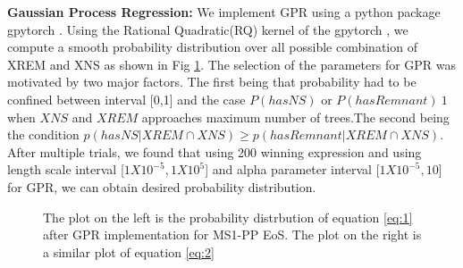 \textbf{Gaussian Process Regression:} We implement GPR using a python package gpytorch \cite{gpytorch}. Using the Rational Quadratic(RQ) kernel of the gpytorch , we compute a smooth probability distribution over all possible combination of XREM and XNS as shown in Fig \ref{fig:probability}. The selection of the parameters for GPR was motivated by two major factors. The first being that probability had to be confined between interval [0,1] and the case $P(hasNS)$ or $P(hasRemnant) ~ 1$ when $XNS$ and $XREM$ approaches maximum number of trees.The second being the condition $p(hasNS| XREM \cap XNS) \geq p(hasRemnant| XREM \cap XNS)$. After multiple trials, we found that using 200 winning expression and using length scale interval [$1X10^{-5}, 1X10^{5}$] and alpha parameter interval [$1X10^{-5}, 10$] for GPR, we can obtain desired probability distribution.

\begin{figure}[htp]
  \centering
  \quad
  \caption{The plot on the left is the probability distrbution of equation \ref{eq:1} after GPR implementation for MS1-PP EoS.  The plot on the right is a similar plot of equation \ref{eq:2}  }
  \label{fig:probability}
\end{figure}

